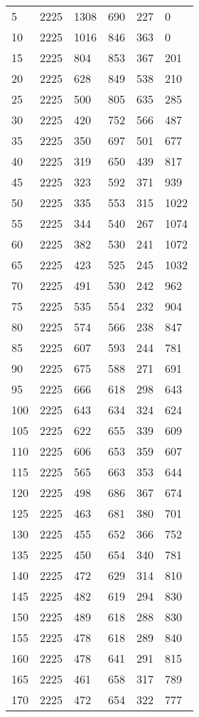 \begin{longtable}{|l|l|l|l|l|l|}
5 & 2225 & 1308 & 690 & 227 & 0 \\
10 & 2225 & 1016 & 846 & 363 & 0 \\
15 & 2225 & 804 & 853 & 367 & 201 \\
20 & 2225 & 628 & 849 & 538 & 210 \\
25 & 2225 & 500 & 805 & 635 & 285 \\
30 & 2225 & 420 & 752 & 566 & 487 \\
35 & 2225 & 350 & 697 & 501 & 677 \\
40 & 2225 & 319 & 650 & 439 & 817 \\
45 & 2225 & 323 & 592 & 371 & 939 \\
50 & 2225 & 335 & 553 & 315 & 1022 \\
55 & 2225 & 344 & 540 & 267 & 1074 \\
60 & 2225 & 382 & 530 & 241 & 1072 \\
65 & 2225 & 423 & 525 & 245 & 1032 \\
70 & 2225 & 491 & 530 & 242 & 962 \\
75 & 2225 & 535 & 554 & 232 & 904 \\
80 & 2225 & 574 & 566 & 238 & 847 \\
85 & 2225 & 607 & 593 & 244 & 781 \\
90 & 2225 & 675 & 588 & 271 & 691 \\
95 & 2225 & 666 & 618 & 298 & 643 \\
100 & 2225 & 643 & 634 & 324 & 624 \\
105 & 2225 & 622 & 655 & 339 & 609 \\
110 & 2225 & 606 & 653 & 359 & 607 \\
115 & 2225 & 565 & 663 & 353 & 644 \\
120 & 2225 & 498 & 686 & 367 & 674 \\
125 & 2225 & 463 & 681 & 380 & 701 \\
130 & 2225 & 455 & 652 & 366 & 752 \\
135 & 2225 & 450 & 654 & 340 & 781 \\
140 & 2225 & 472 & 629 & 314 & 810 \\
145 & 2225 & 482 & 619 & 294 & 830 \\
150 & 2225 & 489 & 618 & 288 & 830 \\
155 & 2225 & 478 & 618 & 289 & 840 \\
160 & 2225 & 478 & 641 & 291 & 815 \\
165 & 2225 & 461 & 658 & 317 & 789 \\
170 & 2225 & 472 & 654 & 322 & 777 \\

\end{longtable}
